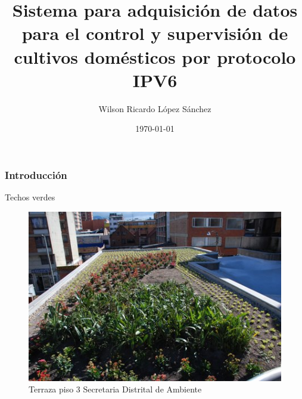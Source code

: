 \documentclass[10pt]{beamer}\usepackage[]{graphicx}\usepackage[]{color}
\begin{document}
\title[Referencias Cruzadas]{Sistema para adquisición de datos para el control y supervisión de cultivos domésticos por protocolo IPV6}
		\author{Wilson Ricardo López Sánchez }
		\date{\today}


\begin{frame}
			\titlepage 
		\end{frame}
		
\begin{frame}
\frametitle{Introducción}
    Techos verdes
	\begin{figure}[ht] %
		\centering
		\includegraphics[scale=2]{techoverde}   %
		\caption{Terraza piso 3 Secretaria Distrital de Ambiente}
		
	\end{figure}
\end{frame}
\end{document}
